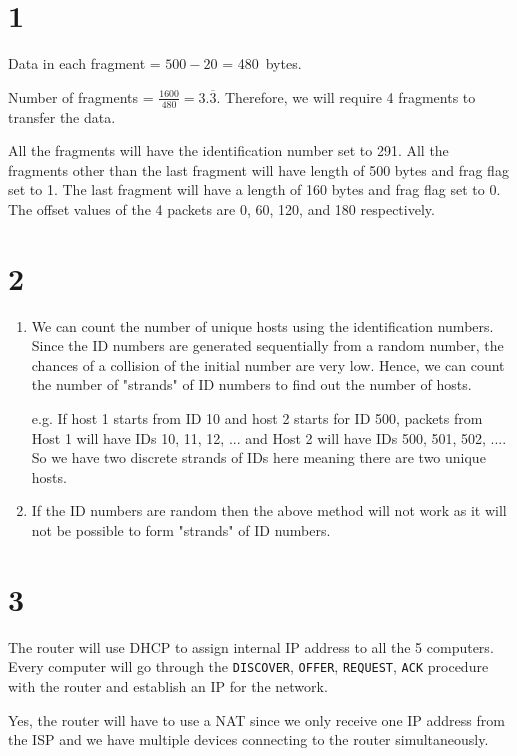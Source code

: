 \section*{1}

Data in each fragment = $500 - 20$ = \SI{480}{bytes}.

Number of fragments = $\frac{1600}{480} = 3.\overline{3}$. Therefore, we will require 4 fragments to transfer the data.

All the fragments will have the identification number set to 291.
All the fragments other than the last fragment will have length of 500 bytes and frag flag set to 1. The last fragment will have a length of 160 bytes and frag flag set to 0. The offset values of the 4 packets are 0, 60, 120, and 180 respectively.

\section*{2}
\begin{enumerate}[label=\alph*.]
    \item We can count the number of unique hosts using the identification numbers. Since the ID numbers are generated sequentially from a random number, the chances of a collision of the initial number are very low. Hence, we can count the number of "strands" of ID numbers to find out the number of hosts.
    
    e.g. If host 1 starts from ID 10 and host 2 starts for ID 500, packets from Host 1 will have IDs 10, 11, 12, ... and Host 2 will have IDs 500, 501, 502, .... So we have two discrete strands of IDs here meaning there are two unique hosts.
    
    \item If the ID numbers are random then the above method will not work as it will not be possible to form "strands" of ID numbers.
\end{enumerate}

\section*{3}
The router will use DHCP to assign internal IP address to all the 5 computers. Every computer will go through the \texttt{DISCOVER}, \texttt{OFFER}, \texttt{REQUEST}, \texttt{ACK} procedure with the router and establish an IP for the network.

Yes, the router will have to use a NAT since we only receive one IP address from the ISP and we have multiple devices connecting to the router simultaneously.

